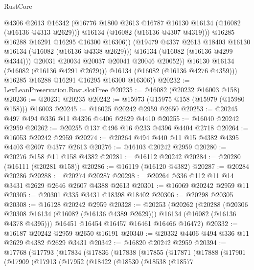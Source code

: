 \begin{lexlean}{RustCore}
\begin{coremodule}
                        @4306
                        @2613
                        @16342
                        (@16776 @1800 @2613 @16787 @16130 @16134 (@16082 (@16136 @4313 @2629)))
                        @16134
                        (@16082 (@16136 @4307 @4319)))
                      @16285
                      @16288
                      @16291
                      @16295
                      @16300
                      @16306))
                  (@19479 @4337 @2613 @18403 @16130 @16134 (@16082 (@16136 @4338 @2629)))
                  @16134
                  (@16082 (@16136 @4299 @4344)))
                @20031
                @20034
                @20037
                @20041
                @20046
                @20052))
            @16130
            @16134
            (@16082 (@16136 @4291 @2629)))
          @16134
          (@16082 (@16136 @4276 @4359)))
        @16285
        @16288
        @16291
        @16295
        @16300
        @16306))
@20232 := LexLeanPreservation.Rust.slotFree
@20235 := @16082 (@20232 @16003 @158)
@20236 := @20231 @20235
@20242 := @15973 (@15975 @158 (@15979 (@15980 @158))) @16003
@20245 := @16025 @20242 @2959 @2650
@20253 := @20245 @497 @494 @336 @11 @4396 @4406 @2629 @4410
@20255 := @16040 @20242 @2959
@20262 := @20255 @137 @496 @16 @233 @4396 @4404 @2718
@20264 := @16053 @20242 @2959
@20274 := @20264 @494 @440 @11 @15 @4382 @4395 @4403 @2607 @4377 @2613
@20276 := @16103 @20242 @2959
@20280 := @20276 @158 @11 @158 @4382
@20281 := @16112 @20242
@20284 := @20280 (@16111 (@20281 @158))
@20286 := @16119 (@16120 @4382)
@20287 := @20284 @20286
@20288 := @20274 @20287
@20298 := @20264 @336 @112 @11 @14 @3431 @2629 @2646 @2607 @4388 @2613
@20301 := @16069 @20242 @2959 @11
@20305 := @20301 @335 @3431 @18398 @18402
@20306 := @20298 @20305
@20308 := @16128 @20242 @2959
@20328 := @20253
    (@20262
      (@20288
        (@20306 @20308 @16134 (@16082 (@16136 @4389 @2629)))
        @16134
        (@16082 (@16136 @4378 @4395)))
      @16451
      @16454
      @16457
      @16461
      @16466
      @16472)
@20332 := @16187 @20242 @2959 @2650 @16191
@20340 := @20332 @4406 @494 @336 @11 @2629 @4382 @2629 @3431
@20342 := @16820 @20242 @2959
@20394 := @17768
    (@17793
      (@17834
        (@17836
          (@17838
            (@17855
              (@17871
                (@17888
                  (@17901
                    (@17909
                      (@17913
                        (@17952
                          (@18422
                            (@18530
                              (@18538
                                (@18577

\end{coremodule}
\end{lexlean}
